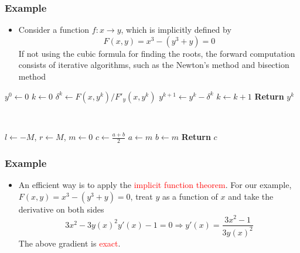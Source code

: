 \documentclass{beamer}
\begin{document}
\begin{frame}
	\frametitle{Example}
	
\begin{itemize}
	\item Consider a function $f:x\rightarrow y$, which is implicitly defined by 
	$$F(x,y) = x^3 - (y^3+y) = 0$$
If not using the cubic formula for finding the roots, the forward computation consists of iterative algorithms, such as the Newton's method and bisection method
\end{itemize}



\begin{minipage}[t]{0.48\textwidth}
\centering
\begin{algorithmic}
\State $y^0 \gets 0$
\State $k \gets 0$
\State $\delta^k \gets F(x, y^k)/F'_y(x,y^k)$
\State $y^{k+1}\gets y^k - \delta^k$
\State $k \gets k+1$
\EndWhile
\State \textbf{Return} $y^k$
\end{algorithmic}
\end{minipage}~
\begin{minipage}[t]{0.48\textwidth}
\centering
\begin{algorithmic}
\State $l \gets -M$, $r\gets M$, $m\gets 0$
\State $c \gets \frac{a+b}{2}$
\State $a\gets m$
\Else
\State $b\gets m$
\EndIf
\EndWhile
\State \textbf{Return} $c$
\end{algorithmic}

\end{minipage}	

\end{frame}

\begin{frame}
	\frametitle{Example}
	
	\begin{itemize}
		\item An efficient way is to apply the \textcolor{red}{implicit function theorem}. For our example, $F(x,y)=x^3-(y^3+y)=0$, treat $y$ as a function of $x$ and take the derivative on both sides
		$$3x^2 - 3y(x)^2y'(x)-1=0\Rightarrow y'(x) = \frac{3x^2-1}{3y(x)^2}$$
	The above gradient is \textcolor{red}{exact}.
	\end{itemize}
	
\end{frame}
\end{document}
